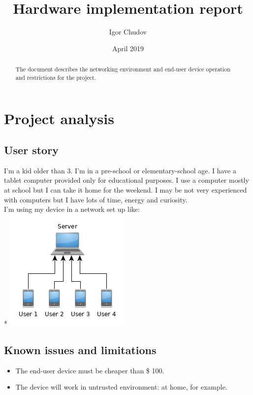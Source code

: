 \documentclass[a4paper]{report}
\begin{document}
\title{Hardware implementation report}
\author{Igor Chudov}
\date{April 2019}
\maketitle

\begin{abstract}
The document describes the networking environment and end-user device
operation and restrictions for the project.
\end{abstract}

\part{Project analysis}

\chapter{User story}

I'm a kid older than 3. I'm in a pre-school or elementary-school age. I
have a tablet computer provided only for educational purposes. I use a
computer mostly at school but I can take it home for the weekend. I may
be not very experienced with computers but I have lots of time, energy
and curiosity. \\

\noindent
I'm using my device in a network set up like: \\*
\includegraphics{school.png}


\chapter{Known issues and limitations}

\begin{itemize}
\item The end-user device must be cheaper than \$ 100.
\item The device will work in untrusted environment: at home, for example.
\end{itemize}
\end{document}
